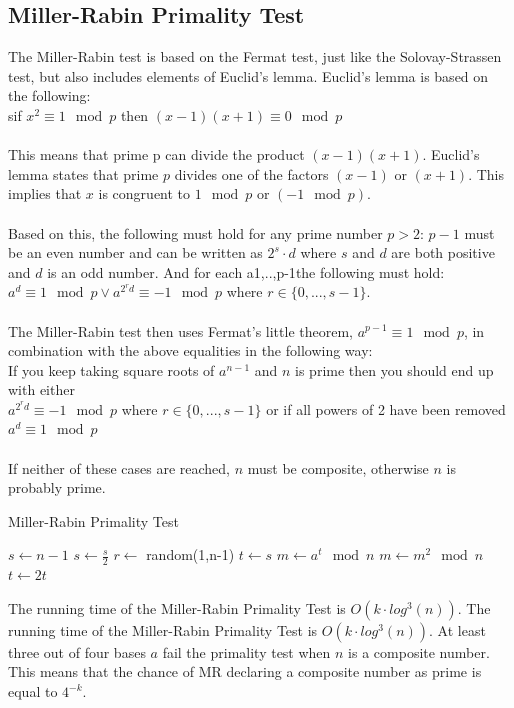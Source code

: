 \documentclass[compressed,final,notitlepage,narroweqnarray,inline,twoside,]{ieee}
\begin{document}
\subsection{Miller-Rabin Primality Test}
The Miller-Rabin test \cite{MR} is based on the Fermat test, just like the Solovay-Strassen test, but also includes elements of Euclid’s lemma.  Euclid’s lemma is based on the following:\\ sif $x^2 \equiv  1 \mod p$ then $(x-1)(x+1) \equiv  0 \mod p$\\\\ This means that prime p can divide the product $(x-1)(x+1)$. Euclid’s lemma states that prime $p$ divides one of the factors $(x-1)$ or $(x+1)$. This implies that $x$ is congruent to $1 \mod p$ or $(-1 \mod p)$.\\\\ Based on this, the following must hold for any prime number $p>2$:
$p-1$ must be an even number and can be written as $2^s \cdot d$ where $s$ and $d$ are both positive and $d$ is an odd number. And for each a{1,..,p-1}the following must hold:
$a^d \equiv 1 \mod p \vee a^{2^r d} \equiv  -1 \mod p$ where $r \in \{0,...,s-1\}$.\\\\ The Miller-Rabin test then uses Fermat’s little theorem, $a^{p-1} \equiv 1 \mod p$, in combination with the above equalities in the following way:\\If you keep taking square roots of $a^{n-1}$ and $n$ is prime then you should end up with either\\ $a^{2^r d} \equiv  -1 \mod p$ where $r \in \{0,...,s-1\}$ or if all powers of 2 have been removed $a^d \equiv  1 \mod p$\\\\If neither of these cases are reached, $n$ must be composite, otherwise $n$ is probably prime.
\begin{algorithm}[ht]
 \caption{Miller-Rabin Primality Test}
 $s \longleftarrow n-1$ \;
 {
 	$s \longleftarrow \frac{s}{2}$\;
 }
 {
	$r \longleftarrow$ random(1,n-1) \;
	$t \longleftarrow s$\;
	$m \longleftarrow a^t \mod n$ \;
	 {
	 	$m \longleftarrow m^2 \mod n$ \;
	 	$t \longleftarrow 2t$
	 }
	{
		\;
	}
 }
 \;
\end{algorithm}
The running time of the Miller-Rabin Primality Test is  $O(k \cdot log^3(n))$. The running time of the Miller-Rabin Primality Test is  $O(k \cdot log^3(n))$. At least three out of four bases $a$ fail the primality test when $n$ is a composite number. This means that the chance of MR declaring a composite number as prime is equal to $4^{-k}$.
\end{document}

